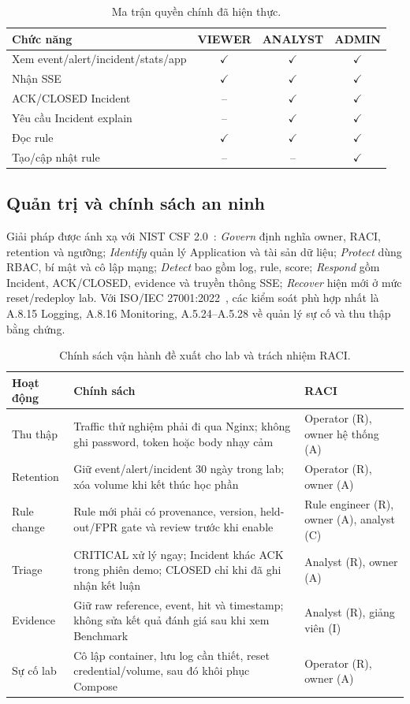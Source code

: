 \documentclass[runningheads]{report-template/llncs}
\newcommand{\yes}{\(\checkmark\)}
\newcommand{\na}{--}
\begin{document}
\begin{table}
\caption{Ma trận quyền chính đã hiện thực.}
\label{tab:rbac}
\centering\small
\begin{tabular}{@{}lccc@{}}
\toprule
Chức năng & VIEWER & ANALYST & ADMIN\\
\midrule
Xem event/alert/incident/stats/app & \yes & \yes & \yes\\
Nhận SSE & \yes & \yes & \yes\\
ACK/CLOSED Incident & \na & \yes & \yes\\
Yêu cầu Incident explain & \na & \yes & \yes\\
Đọc rule & \yes & \yes & \yes\\
Tạo/cập nhật rule & \na & \na & \yes\\
\bottomrule
\end{tabular}
\end{table}

\subsection{Quản trị và chính sách an ninh}

Giải pháp được ánh xạ với NIST CSF 2.0~\cite{nistcsf}: \emph{Govern}
định nghĩa owner, RACI, retention và ngưỡng; \emph{Identify} quản lý
Application và tài sản dữ liệu; \emph{Protect} dùng RBAC, bí mật và cô
lập mạng; \emph{Detect} bao gồm log, rule, score; \emph{Respond} gồm
Incident, ACK/CLOSED, evidence và truyền thông SSE; \emph{Recover} hiện
mới ở mức reset/redeploy lab. Với ISO/IEC 27001:2022~\cite{iso27001},
các kiểm soát phù hợp nhất là A.8.15 Logging, A.8.16 Monitoring,
A.5.24--A.5.28 về quản lý sự cố và thu thập bằng chứng.

\begin{table}
\caption{Chính sách vận hành đề xuất cho lab và trách nhiệm RACI.}
\label{tab:policy}
\centering\scriptsize
\begin{tabularx}{\textwidth}{@{}p{25mm}p{35mm}Y@{}}
\toprule
Hoạt động & Chính sách & RACI\\
\midrule
Thu thập & Traffic thử nghiệm phải đi qua Nginx; không ghi password,
token hoặc body nhạy cảm & Operator (R), owner hệ thống (A)\\
Retention & Giữ event/alert/incident 30 ngày trong lab; xóa volume khi
kết thúc học phần & Operator (R), owner (A)\\
Rule change & Rule mới phải có provenance, version, held-out/FPR gate và
review trước khi enable & Rule engineer (R), owner (A), analyst (C)\\
Triage & CRITICAL xử lý ngay; Incident khác ACK trong phiên demo; CLOSED
chỉ khi đã ghi nhận kết luận & Analyst (R), owner (A)\\
Evidence & Giữ raw reference, event, hit và timestamp; không sửa kết quả
đánh giá sau khi xem Benchmark & Analyst (R), giảng viên (I)\\
Sự cố lab & Cô lập container, lưu log cần thiết, reset credential/volume,
sau đó khôi phục Compose & Operator (R), owner (A)\\
\bottomrule
\end{tabularx}
\end{table}
\end{document}
